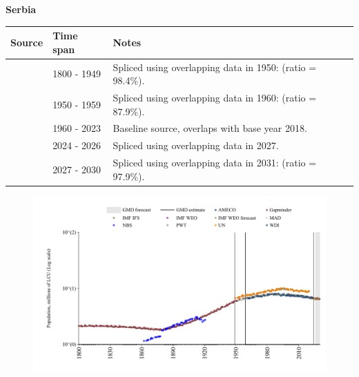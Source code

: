 \documentclass[12pt,a4paper,landscape]{article}
\begin{document}
\begin{adjustbox}{max totalsize={\paperwidth}{\paperheight},center}
\begin{minipage}[t][\textheight][t]{\textwidth}
\vspace*{0.5cm}
{}
\begin{center}
{\Large\bfseries Serbia}
\end{center}
\vspace{0.5cm}
\begin{table}[H]
\centering
\small
\begin{tabular}{|l|l|l|}
\hline
\textbf{Source} & \textbf{Time span} & \textbf{Notes} \\
\hline
\rowcolor{white}\cite{Gapminder}& 1800 - 1949 &Spliced using overlapping data in 1950: (ratio = 98.4\%).\\
\rowcolor{lightgray}\cite{IMF_IFS}& 1950 - 1959 &Spliced using overlapping data in 1960: (ratio = 87.9\%).\\
\rowcolor{white}\cite{WDI}& 1960 - 2023 &Baseline source, overlaps with base year 2018.\\
\rowcolor{lightgray}\cite{AMECO}& 2024 - 2026 &Spliced using overlapping data in 2027.\\
\rowcolor{white}\cite{Gapminder}& 2027 - 2030 &Spliced using overlapping data in 2031: (ratio = 97.9\%).\\
\hline
\end{tabular}
\end{table}
\begin{figure}[H]
\centering
\includegraphics[width=\textwidth,height=0.6\textheight,keepaspectratio]{graphs/SRB_pop.pdf}
\end{figure}
\end{minipage}
\end{adjustbox}
\end{document}
